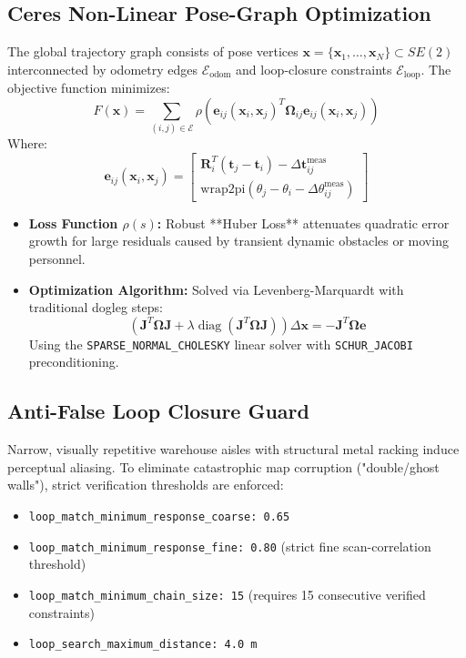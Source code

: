 \documentclass[10pt,a4paper]{article}
\begin{document}
\subsection{Ceres Non-Linear Pose-Graph Optimization}
The global trajectory graph consists of pose vertices $\mathbf{x} = \{\mathbf{x}_1, \dots, \mathbf{x}_N\} \subset SE(2)$ interconnected by odometry edges $\mathcal{E}_{\text{odom}}$ and loop-closure constraints $\mathcal{E}_{\text{loop}}$. The objective function minimizes:
\begin{equation}
F(\mathbf{x}) = \sum_{(i,j) \in \mathcal{E}} \rho\left( \mathbf{e}_{ij}(\mathbf{x}_i, \mathbf{x}_j)^T \mathbf{\Omega}_{ij} \mathbf{e}_{ij}(\mathbf{x}_i, \mathbf{x}_j) \right)
\end{equation}
Where:
\begin{equation}
\mathbf{e}_{ij}(\mathbf{x}_i, \mathbf{x}_j) = \begin{bmatrix} \mathbf{R}_i^T (\mathbf{t}_j - \mathbf{t}_i) - \Delta\mathbf{t}_{ij}^{\text{meas}} \\ \text{wrap2pi}(\theta_j - \theta_i - \Delta\theta_{ij}^{\text{meas}}) \end{bmatrix}
\end{equation}
\begin{itemize}
    \item \textbf{Loss Function $\rho(s)$:} Robust **Huber Loss** attenuates quadratic error growth for large residuals caused by transient dynamic obstacles or moving personnel.
    \item \textbf{Optimization Algorithm:} Solved via Levenberg-Marquardt with traditional dogleg steps:
    \begin{equation}
    \left(\mathbf{J}^T \mathbf{\Omega} \mathbf{J} + \lambda \operatorname{diag}(\mathbf{J}^T \mathbf{\Omega} \mathbf{J})\right) \Delta\mathbf{x} = -\mathbf{J}^T \mathbf{\Omega} \mathbf{e}
    \end{equation}
    Using the \texttt{SPARSE\_NORMAL\_CHOLESKY} linear solver with \texttt{SCHUR\_JACOBI} preconditioning.
\end{itemize}

\subsection{Anti-False Loop Closure Guard}
Narrow, visually repetitive warehouse aisles with structural metal racking induce perceptual aliasing. To eliminate catastrophic map corruption ("double/ghost walls"), strict verification thresholds are enforced:
\begin{itemize}
    \item \texttt{loop\_match\_minimum\_response\_coarse: 0.65}
    \item \texttt{loop\_match\_minimum\_response\_fine: 0.80} (strict fine scan-correlation threshold)
    \item \texttt{loop\_match\_minimum\_chain\_size: 15} (requires 15 consecutive verified constraints)
    \item \texttt{loop\_search\_maximum\_distance: 4.0 m}
\end{itemize}
\end{document}
